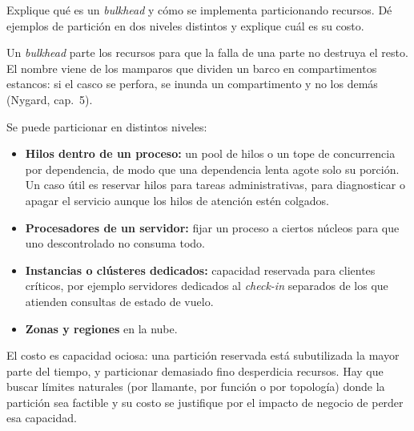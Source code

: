 \documentclass[variant=guia,cover=institutional,mode=screen]{ua-engineering-v6-article}
\begin{document}
\begin{uaexercise}
Explique qué es un \emph{bulkhead} y cómo se implementa particionando recursos. Dé ejemplos de partición en dos niveles distintos y explique cuál es su costo.
\end{uaexercise}
\begin{uaanswer}
Un \emph{bulkhead} parte los recursos para que la falla de una parte no destruya el resto. El nombre viene de los mamparos que dividen un barco en compartimentos estancos: si el casco se perfora, se inunda un compartimento y no los demás (Nygard, cap.~5).

Se puede particionar en distintos niveles:
\begin{itemize}
\item \textbf{Hilos dentro de un proceso:} un pool de hilos o un tope de concurrencia por dependencia, de modo que una dependencia lenta agote solo su porción. Un caso útil es reservar hilos para tareas administrativas, para diagnosticar o apagar el servicio aunque los hilos de atención estén colgados.
\item \textbf{Procesadores de un servidor:} fijar un proceso a ciertos núcleos para que uno descontrolado no consuma todo.
\item \textbf{Instancias o clústeres dedicados:} capacidad reservada para clientes críticos, por ejemplo servidores dedicados al \emph{check-in} separados de los que atienden consultas de estado de vuelo.
\item \textbf{Zonas y regiones} en la nube.
\end{itemize}

El costo es capacidad ociosa: una partición reservada está subutilizada la mayor parte del tiempo, y particionar demasiado fino desperdicia recursos. Hay que buscar límites naturales (por llamante, por función o por topología) donde la partición sea factible y su costo se justifique por el impacto de negocio de perder esa capacidad.
\end{uaanswer}
\end{document}

